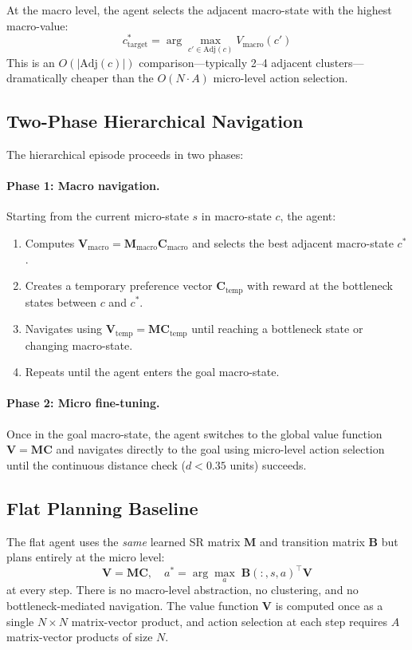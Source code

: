 \documentclass[11pt,a4paper]{article}
\newcommand{\M}{\mathbf{M}}
\newcommand{\B}{\mathbf{B}}
\newcommand{\C}{\mathbf{C}}
\newcommand{\V}{\mathbf{V}}
\newcommand{\Mmacro}{\M_{\text{macro}}}
\newcommand{\Cmacro}{\C_{\text{macro}}}
\newcommand{\Vmacro}{\V_{\text{macro}}}
\begin{document}
At the macro level, the agent selects the adjacent macro-state with the highest macro-value:
\begin{equation}
    c^*_{\text{target}} = \arg\max_{c' \in \text{Adj}(c)} V_{\text{macro}}(c')
\end{equation}
This is an $O(|\text{Adj}(c)|)$ comparison---typically 2--4 adjacent clusters---dramatically cheaper than the $O(N \cdot A)$ micro-level action selection.

\subsection{Two-Phase Hierarchical Navigation}
\label{sec:two_phase}

The hierarchical episode proceeds in two phases:

\paragraph{Phase 1: Macro navigation.}
Starting from the current micro-state $s$ in macro-state $c$, the agent:
\begin{enumerate}[noitemsep]
    \item Computes $\Vmacro = \Mmacro \Cmacro$ and selects the best adjacent macro-state $c^*$.
    \item Creates a temporary preference vector $\C_{\text{temp}}$ with reward at the bottleneck states between $c$ and $c^*$.
    \item Navigates using $\V_{\text{temp}} = \M \C_{\text{temp}}$ until reaching a bottleneck state or changing macro-state.
    \item Repeats until the agent enters the goal macro-state.
\end{enumerate}

\paragraph{Phase 2: Micro fine-tuning.}
Once in the goal macro-state, the agent switches to the global value function $\V = \M \C$ and navigates directly to the goal using micro-level action selection until the continuous distance check ($d < 0.35$ units) succeeds.

\subsection{Flat Planning Baseline}
\label{sec:flat}

The flat agent uses the \emph{same} learned SR matrix $\M$ and transition matrix $\B$ but plans entirely at the micro level:
\begin{equation}
    \V = \M \C, \quad a^* = \arg\max_a \; \B(:, s, a)^\top \V
\end{equation}
at every step.
There is no macro-level abstraction, no clustering, and no bottleneck-mediated navigation.
The value function $\V$ is computed once as a single $N \times N$ matrix-vector product, and action selection at each step requires $A$ matrix-vector products of size $N$.
\end{document}
